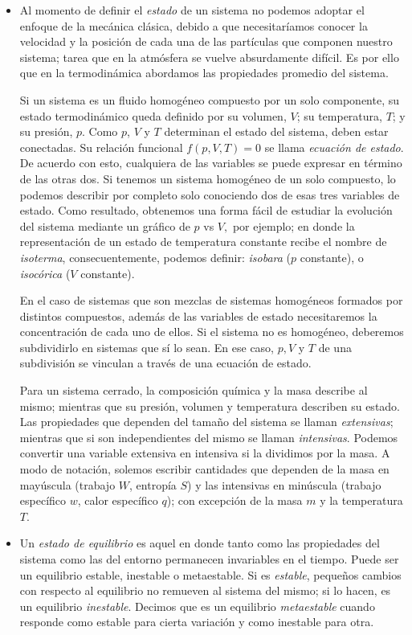 \documentclass[openany]{book}
\begin{document}
\begin{itemize}
	\item Al momento de definir el \emph{estado} de un sistema no podemos adoptar el enfoque de la mecánica clásica, debido a que necesitaríamos conocer la velocidad y la posición de cada una de las partículas que componen nuestro sistema; tarea que en la atmósfera se vuelve absurdamente difícil. Es por ello que en la termodinámica abordamos las propiedades promedio del sistema.\par Si un sistema es un fluido homogéneo compuesto por un solo componente, su estado termodinámico queda definido por su volumen, $V$; su temperatura, $T$; y su presión, $p$. Como $p$, $V$ y $T$ determinan el estado del sistema, deben estar conectadas. Su relación funcional $f(p,V,T)=0$ se llama \emph{ecuación de estado}. De acuerdo con esto, cualquiera de las variables se puede expresar en término de las otras dos. Si tenemos un sistema homogéneo de un solo compuesto, lo podemos describir por completo solo conociendo dos de esas tres variables de estado. Como resultado, obtenemos una forma fácil de estudiar la evolución del sistema mediante un gráfico de $p$ vs $V,$ por ejemplo; en donde la representación de un estado de temperatura constante recibe el nombre de \emph{isoterma}, consecuentemente, podemos definir: \emph{isobara} ($p$ constante), o \emph{isocórica} ($V$ constante).\par En el caso de sistemas que son mezclas de sistemas homogéneos formados por distintos compuestos, además de las variables de estado necesitaremos la concentración de cada uno de ellos. Si el sistema no es homogéneo, deberemos subdividirlo en sistemas que sí lo sean. En ese caso, $p,V$ y $T$ de una subdivisión se vinculan a través de una ecuación de estado.\par Para un sistema cerrado, la composición química y la masa describe al mismo; mientras que su presión, volumen y temperatura describen su estado. Las propiedades que dependen del tamaño del sistema se llaman \emph{extensivas}; mientras que si son independientes del mismo se llaman \emph{intensivas}. Podemos convertir una variable extensiva en intensiva si la dividimos por la masa. A modo de notación, solemos escribir cantidades que dependen de la masa en mayúscula (trabajo $W$, entropía $S$) y las intensivas en minúscula (trabajo específico $w$, calor específico $q$); con excepción de la masa $m$ y la temperatura $T$.
	\item Un \emph{estado de equilibrio} es aquel en donde tanto como las propiedades del sistema como las del entorno permanecen invariables en el tiempo. Puede ser un equilibrio estable, inestable o metaestable. Si es \emph{estable}, pequeños cambios con respecto al equilibrio no remueven al sistema del mismo; si lo hacen, es un equilibrio \emph{inestable}. Decimos que es un equilibrio \emph{metaestable} cuando responde como estable para cierta variación y como inestable para otra.

\end{itemize}
\end{document}
